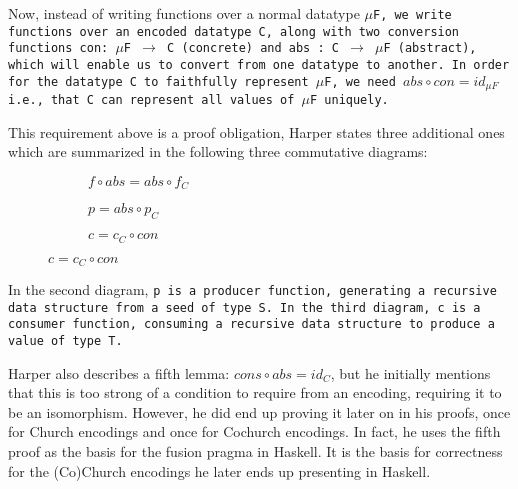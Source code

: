 Now, instead of writing functions over a normal datatype \tt{$\mu$F}, we write functions over an encoded datatype \tt{C}, along with two conversion functions \tt{con: $\mu$F $\to$ C} (concrete) and \tt{abs : C $\to$ $\mu$F} (abstract), which will enable us to convert from one datatype to another.
In order for the datatype \tt{C} to faithfully represent \tt{$\mu$F}, we need $abs \circ con = id_{\mu F}$ i.e., that \tt{C} can represent all values of \tt{$\mu$F} uniquely.

This requirement above is a proof obligation, Harper states three additional ones which are summarized in the following three commutative diagrams:

\begin{figure}[H]\hfill
    \begin{subfigure}{0.32\textwidth}
        \hfill{}\hfill\null
        \caption*{$f\circ abs = abs\circ f_C$}
    \end{subfigure}
    \begin{subfigure}{0.32\textwidth}
        \hfill{}\hfill\null
        \caption*{$p = abs\circ p_C$}
    \end{subfigure}
    \begin{subfigure}{0.32\textwidth}
        \hfill{}\hfill\null
        \caption*{$c = c_C\circ con$}
    \end{subfigure}
\end{figure}

In the second diagram, \tt{p} is a producer function, generating a recursive data structure from a seed of type \tt{S}.
In the third diagram, \tt{c} is a consumer function, consuming a recursive data structure to produce a value of type \tt{T}.

Harper also describes a fifth lemma: $cons \circ abs = id_C$,
but he initially mentions that this is too strong of a condition to require from an encoding, requiring it to be an isomorphism.
However, he did end up proving it later on in his proofs, once for Church encodings and once for Cochurch encodings.
In fact, he uses the fifth proof as the basis for the fusion pragma in Haskell.
It is the basis for correctness for the (Co)Church encodings he later ends up presenting in Haskell.

